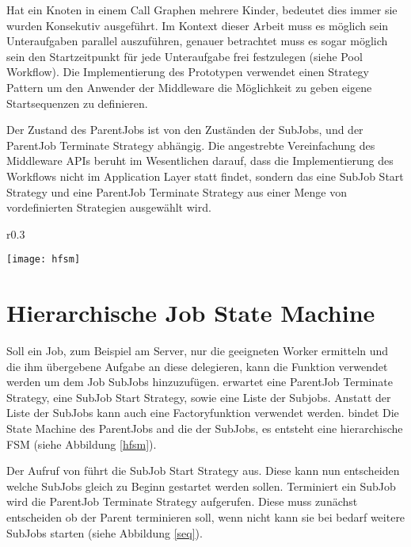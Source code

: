 Hat ein Knoten in einem Call Graphen mehrere Kinder, bedeutet dies immer sie wurden Konsekutiv ausgeführt.
Im Kontext dieser Arbeit muss es möglich sein Unteraufgaben parallel auszuführen, genauer betrachtet muss es sogar möglich sein den Startzeitpunkt für jede Unteraufgabe frei festzulegen (siehe Pool Workflow).
Die Implementierung des Prototypen verwendet einen Strategy Pattern um den Anwender der Middleware die Möglichkeit zu geben eigene Startsequenzen zu definieren.

Der Zustand des ParentJobs ist von den Zuständen der SubJobs, und der ParentJob Terminate Strategy abhängig.
Die angestrebte Vereinfachung des Middleware APIs  beruht im Wesentlichen darauf, dass die Implementierung des Workflows nicht im Application Layer statt findet, sondern das eine SubJob Start Strategy und eine ParentJob Terminate Strategy aus einer Menge von vordefinierten  Strategien ausgewählt wird.






\begin{wrapfigure}{r}{0.3\textwidth}
  \vspace{-55pt}
  \begin{center}
    \texttt{[image: hfsm]}
  \end{center}
  \label{hfsm}
  \caption{Immer wenn eine der untergeordneten State Machines terminiert, wird der Workflow Logic Terminate Strategie aufgerufen.
  Dieser entscheidet ob die Übergeordnete State Machine ihren State ändern muss.}
\end{wrapfigure}
\section{Hierarchische Job State Machine}
Soll ein Job, zum Beispiel am Server, nur die geeigneten Worker ermitteln und die ihm übergebene Aufgabe an diese delegieren, kann die Funktion \JobDelegate{} verwendet werden um dem Job SubJobs hinzuzufügen.
\JobDelegate{} erwartet eine ParentJob Terminate Strategy, eine SubJob Start Strategy, sowie eine Liste der Subjobs.
Anstatt der Liste der SubJobs kann auch eine Factoryfunktion verwendet werden.
\JobDelegate{} bindet Die State Machine des ParentJobs and die der SubJobs, es entsteht eine hierarchische FSM (siehe Abbildung \ref{hfsm}).

Der Aufruf von \JobDelegate{} führt die SubJob Start Strategy aus.
Diese kann nun entscheiden welche SubJobs gleich zu Beginn gestartet werden sollen.
Terminiert ein SubJob wird die ParentJob Terminate Strategy aufgerufen.
Diese muss zunächst entscheiden ob der Parent terminieren soll, wenn nicht kann sie bei bedarf weitere SubJobs starten (siehe Abbildung \ref{seq}).

